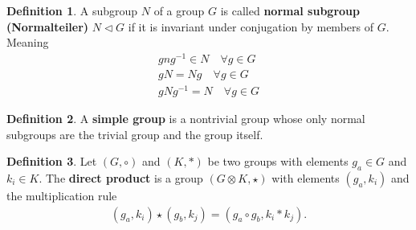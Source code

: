 \documentclass[10pt,a4paper]{article}
\theoremstyle{definition}
\newtheorem{definition}{Definition}[section]
\begin{document}
\begin{definition}{}
A subgroup $N$ of a group $G$ is called {\bf normal subgroup (Normalteiler)} $N\vartriangleleft G$ if it is invariant under conjugation by members of $G$. Meaning
\begin{align}
    gng^{-1}\in N\quad \forall g\in G\\
    gN=Ng  \quad \forall g\in G\\
    gNg^{-1}=N  \quad \forall g\in G
\end{align}
\end{definition}

\begin{definition}{}
A {\bf simple group} is a nontrivial group whose only normal subgroups are the trivial group and the group itself.
\end{definition}

\begin{definition}{}
Let $(G,\circ)$ and $(K,*)$ be two groups with elements $g_a\in G$ and $k_i\in K$. The {\bf direct product} is a group $(G\otimes K,\star)$ with elements $(g_a,k_i)$ and the multiplication rule
\begin{align}
(g_a,k_i)\star(g_b,k_j)=(g_a\circ g_b,k_i*k_j).
\end{align}
\end{definition}
\end{document}
